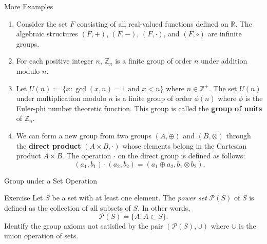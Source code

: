 \documentclass{beamer}
\begin{document}
\begin{frame}{More Examples}
\begin{enumerate}
\justifying
\item Consider the set $F$ consisting of all real-valued functions defined on $\mathbb{R}$. The algebraic structures $(F, +)$, $(F, -)$, $(F, \cdot)$, and $(F, \circ)$ are infinite groups.  
\pause
\item For each positive integer $n$, $\mathbb{Z}_n$ is a finite group of order $n$ under addition modulo $n$.
\pause
\item Let $U(n) := \{x : \gcd(x, n) = 1 \text{ and } x < n\}$ where $n \in \mathbb{Z}^+$. The set $U(n)$ under multiplication modulo $n$ is a finite group of order $\phi(n)$ where $\phi$ is the Euler-phi number theoretic function. This group is called the \textbf{group of units} of $\mathbb{Z}_n$.
\pause
\item We can form a new group from two groups $(A, \oplus)$ and $(B, \otimes)$ through the \textbf{direct product} $(A \times B, \cdot)$ whose elements belong in the Cartesian product $A \times B$. The operation $\cdot$ on the direct group is defined as follows:
\[
(a_1, b_1) \cdot (a_2, b_2) = (a_1 \oplus a_2, b_1 \otimes b_2).
\]
\end{enumerate}
\end{frame}

\begin{frame}{Group under a Set Operation}
\begin{block}{Exercise}
\justifying
Let $S$ be a set with at least one element. The \textit{power set} $\mathcal{P}(S)$ of $S$ is defined as the collection of all subsets of $S$. In other words,
\[
\mathcal{P}(S) = \{A : A \subset S\}.
\]
Identify the group axioms not satisfied by the pair $(\mathcal{P}(S), \cup)$ where $\cup$ is the union operation of sets. 
\end{block}
\end{frame}
\end{document}
